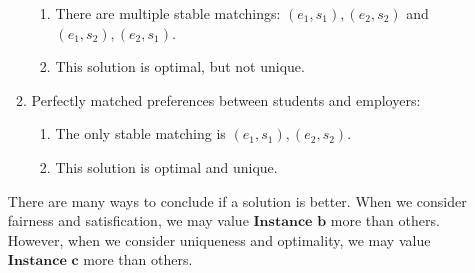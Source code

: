 \documentclass[12pt]{article}
\begin{document}
\begin{enumerate}
\begin{enumerate}
\begin{enumerate}[-]
                    \item There are multiple stable matchings: 
                    $(e_1, s_1), (e_2, s_2)$ and $(e_1, s_2), (e_2, s_1)$.
                    \item This solution is optimal, but not unique.
                \end{enumerate}
                \item Perfectly matched preferences between students and employers:
                \begin{enumerate}[-]
                    \item The only stable matching is $(e_1, s_1), (e_2, s_2)$.
                    \item This solution is optimal and unique.
                \end{enumerate}
            \end{enumerate}
            There are many ways to conclude if a solution is better.
            When we consider fairness and satisfication, we may value $\textbf{Instance b}$ more than 
            others. However, when we consider uniqueness and optimality, 
            we may value $\textbf{Instance c}$ more than others.
    \end{enumerate}
\end{document}

